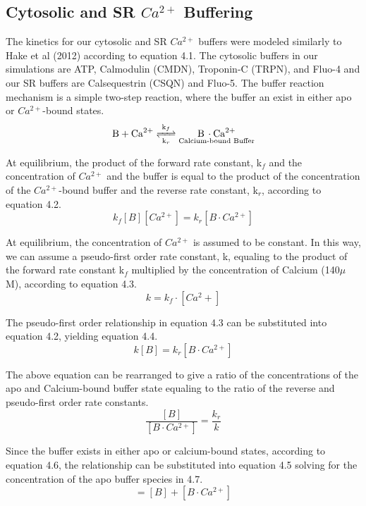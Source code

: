 \documentclass[12pt]{ucsddissertation}
\begin{document}
\subsection{Cytosolic and SR $Ca^{2+}$ Buffering}

The kinetics for our cytosolic and SR $Ca^{2+}$ buffers were modeled similarly to Hake et al (2012) according to equation 4.1. The cytosolic buffers in our simulations are ATP, Calmodulin (CMDN), Troponin-C (TRPN), and Fluo-4 and our SR buffers are Calsequestrin (CSQN) and Fluo-5. The buffer reaction mechanism is a simple two-step reaction, where the buffer an exist in either apo or $Ca^{2+}$-bound states. 
\begin{equation} 
\ce{B + Ca^2+  <=>[\ce{k_{f}}][\ce{k_{r}}]
$\underset{\text{Calcium-bound Buffer}}{\ce{B \cdot Ca^{2+}}}$
}
\end{equation}

At equilibrium, the product of the forward rate constant, k$_{f}$ and the concentration of $Ca^{2+}$ and the buffer is equal to the product of the concentration of the $Ca^{2+}$-bound buffer and the reverse rate constant, k$_{r}$, according to equation 4.2.  
\begin{equation}
k_{f}[B][Ca^{2+}] = k_{r}[B \cdot Ca^{2+}]
\end{equation}

At equilibrium, the concentration of $Ca^{2+}$ is assumed to be constant. In this way, we can assume a pseudo-first order rate constant, k, equaling to the product of the forward rate constant k$_{f}$ multiplied by the concentration of Calcium (140$\mu$M), according to equation 4.3. 
\begin{equation}
 k = k_{f} \cdot [Ca^2+]
\end{equation}

The pseudo-first order relationship in equation 4.3 can be substituted into equation 4.2, yielding equation 4.4.
\begin{equation}
k[B] = k_{r}[B \cdot Ca^{2+}]
\end{equation}

The above equation can be rearranged to give a ratio of the concentrations of the apo and Calcium-bound buffer state equaling to the ratio of the reverse and pseudo-first order rate constants.
\begin{equation}
\frac{[B]}{[B  \cdot Ca^{2+}]} = \frac{k_{r}}{k} 
\end{equation}

Since the buffer exists in either apo or calcium-bound states, according to equation 4.6, the relationship can be substituted into equation 4.5 solving for the concentration of the apo buffer species in 4.7. 
\begin{equation}
[Total_{B}] = [B] + [B \cdot Ca^{2+}] 
\end{equation}
\end{document}
